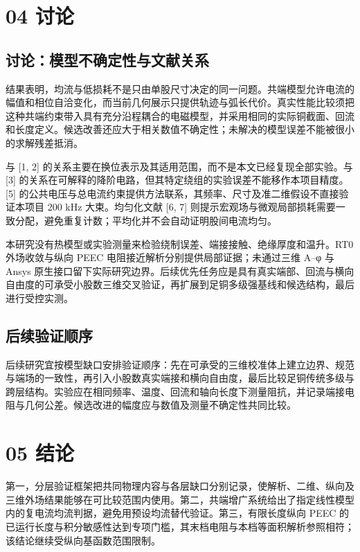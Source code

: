 \documentclass[11pt]{article}
\begin{document}
\section*{04 讨论}
\hypertarget{chapter-04}{}
\subsection*{讨论：模型不确定性与文献关系}
\hypertarget{04.discussion.heading}{}
结果表明，均流与低损耗不是只由单股尺寸决定的同一问题。共端模型允许电流的幅值和相位自洽变化，而当前几何展示只提供轨迹与弧长代价。真实性能比较须把这种共端约束带入具有充分沿程耦合的电磁模型，并采用相同的实际铜截面、回流和长度定义。候选改善还应大于相关数值不确定性；未解决的模型误差不能被很小的求解残差抵消。


与 [1, 2] 的关系主要在换位表示及其适用范围，而不是本文已经复现全部实验。与 [3] 的关系在可解释的降阶电路，但其特定绕组的实验误差不能移作本项目精度。[5] 的公共电压与总电流约束提供方法联系，其频率、尺寸及准二维假设不直接验证本项目 200 kHz 大束。均匀化文献 [6, 7] 则提示宏观场与微观局部损耗需要一致分配，避免重复计数；平均化并不会自动证明股间电流均匀。


本研究没有热模型或实验测量来检验绕制误差、端接接触、绝缘厚度和温升。RT0 外场收敛与纵向 PEEC 电阻接近解析分别提供局部证据；未通过三维 A–φ 与 Ansys 原生接口留下实际研究边界。后续优先任务应是具有真实端部、回流与横向自由度的可承受小股数三维交叉验证，再扩展到足铜多级强基线和候选结构，最后进行受控实测。


\subsection*{后续验证顺序}
\hypertarget{04.recommendations.heading}{}
后续研究宜按模型缺口安排验证顺序：先在可承受的三维校准体上建立边界、规范与端场的一致性，再引入小股数真实端接和横向自由度，最后比较足铜传统多级与跨层结构。实验应在相同频率、温度、回流和轴向长度下测量阻抗，并记录端接电阻与几何公差。候选改进的幅度应与数值及测量不确定性共同比较。


\FloatBarrier
\section*{05 结论}
\hypertarget{chapter-05}{}
第一，分层验证框架把共同物理内容与各层缺口分别记录，使解析、二维、纵向及三维外场结果能够在可比较范围内使用。第二，共端增广系统给出了指定线性模型内的复电流均流判据，避免用预设均流替代验证。第三，有限长度纵向 PEEC 的已运行长度与积分敏感性达到专项门槛，其末档电阻与本档等面积解析参照相符；该结论继续受纵向基函数范围限制。
\end{document}
